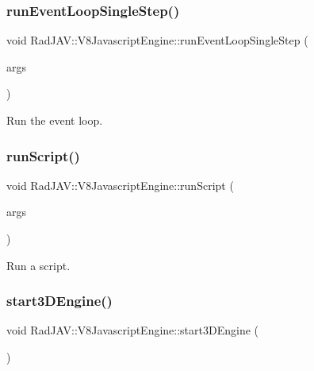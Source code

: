 \subsubsection{\texorpdfstring{run\+Event\+Loop\+Single\+Step()}{runEventLoopSingleStep()}}
{\footnotesize\ttfamily void Rad\+J\+A\+V\+::\+V8\+Javascript\+Engine\+::run\+Event\+Loop\+Single\+Step (\begin{DoxyParamCaption}\item[{const v8\+::\+Function\+Callback\+Info$<$ v8\+::\+Value $>$ \&}]{args }\end{DoxyParamCaption})\hspace{0.3cm}{\ttfamily [static]}}



Run the event loop. 

\mbox{\label{class_rad_j_a_v_1_1_v8_javascript_engine_a4564a04928c0dd79e002ed74b9dc6b5e}} 
\subsubsection{\texorpdfstring{run\+Script()}{runScript()}}
{\footnotesize\ttfamily void Rad\+J\+A\+V\+::\+V8\+Javascript\+Engine\+::run\+Script (\begin{DoxyParamCaption}\item[{const v8\+::\+Function\+Callback\+Info$<$ v8\+::\+Value $>$ \&}]{args }\end{DoxyParamCaption})\hspace{0.3cm}{\ttfamily [static]}}



Run a script. 

\mbox{\label{class_rad_j_a_v_1_1_v8_javascript_engine_ae2e4091f33966a1d722690bcd69f2cde}} 
\subsubsection{\texorpdfstring{start3\+D\+Engine()}{start3DEngine()}}
{\footnotesize\ttfamily void Rad\+J\+A\+V\+::\+V8\+Javascript\+Engine\+::start3\+D\+Engine (\begin{DoxyParamCaption}{ }\end{DoxyParamCaption})\hspace{0.3cm}{\ttfamily [virtual]}}



